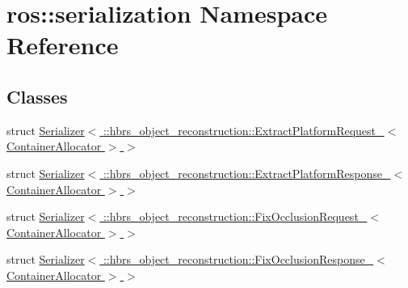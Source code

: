 \hypertarget{namespaceros_1_1serialization}{\section{ros\-:\-:serialization \-Namespace \-Reference}
\label{namespaceros_1_1serialization}
}
\subsection*{\-Classes}
\begin{DoxyCompactItemize}
\item 
struct \hyperlink{structros_1_1serialization_1_1_serializer_3_01_1_1hbrs__object__reconstruction_1_1_extract_platfec7db37c76a5940d2c079d0cd2e0ad4d}{\-Serializer$<$ \-::hbrs\-\_\-object\-\_\-reconstruction\-::\-Extract\-Platform\-Request\-\_\-$<$ Container\-Allocator $>$ $>$}
\item 
struct \hyperlink{structros_1_1serialization_1_1_serializer_3_01_1_1hbrs__object__reconstruction_1_1_extract_platfe22bf269b5082500956997a930b8e1a9}{\-Serializer$<$ \-::hbrs\-\_\-object\-\_\-reconstruction\-::\-Extract\-Platform\-Response\-\_\-$<$ Container\-Allocator $>$ $>$}
\item 
struct \hyperlink{structros_1_1serialization_1_1_serializer_3_01_1_1hbrs__object__reconstruction_1_1_fix_occlusion160a6d889387627dfbb8c5cfdbe2b93f}{\-Serializer$<$ \-::hbrs\-\_\-object\-\_\-reconstruction\-::\-Fix\-Occlusion\-Request\-\_\-$<$ Container\-Allocator $>$ $>$}
\item 
struct \hyperlink{structros_1_1serialization_1_1_serializer_3_01_1_1hbrs__object__reconstruction_1_1_fix_occlusion126146a3e1d2d976c77480a5fe9a7e9d}{\-Serializer$<$ \-::hbrs\-\_\-object\-\_\-reconstruction\-::\-Fix\-Occlusion\-Response\-\_\-$<$ Container\-Allocator $>$ $>$}
\end{DoxyCompactItemize}
